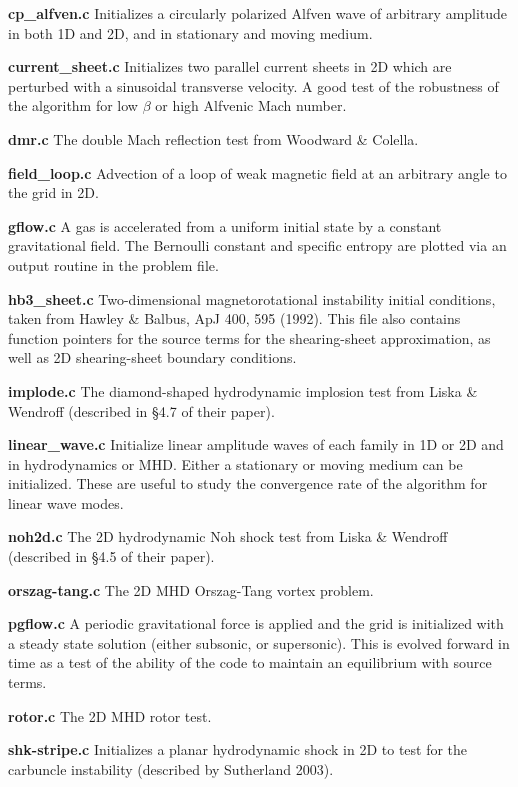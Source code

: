 \bigskip
\noindent
{\bf cp\_alfven.c}
Initializes a circularly polarized Alfven wave of arbitrary amplitude in
both 1D and 2D, and in stationary and moving medium.

\bigskip
\noindent
{\bf current\_sheet.c}
Initializes two parallel current sheets in 2D which are perturbed with a
sinusoidal transverse velocity.  A good test of the robustness of the
algorithm for low $\beta$ or high Alfvenic Mach number.

\bigskip
\noindent
{\bf dmr.c}
The double Mach reflection test from Woodward \& Colella.

\bigskip
\noindent
{\bf field\_loop.c}
Advection of a loop of weak magnetic field at an arbitrary angle to the
grid in 2D.

\bigskip
\noindent
{\bf gflow.c}
A gas is accelerated from a uniform initial state by a constant
gravitational field.  The Bernoulli constant and specific entropy are
plotted via an output routine in the problem file.

\bigskip
\noindent
{\bf hb3\_sheet.c}
Two-dimensional magnetorotational instability initial conditions, taken
from Hawley \& Balbus, ApJ 400, 595 (1992).  This file also contains
function pointers for the source terms for the shearing-sheet approximation,
as well as 2D shearing-sheet boundary conditions.

\bigskip
\noindent
{\bf implode.c}
The diamond-shaped hydrodynamic implosion test from Liska \& Wendroff
(described in \S 4.7 of their paper).

\bigskip
\noindent
{\bf linear\_wave.c}
Initialize linear amplitude waves of each family in 1D or 2D and in
hydrodynamics or MHD.  Either a stationary or moving medium can be
initialized.  These are
useful to study the convergence rate of the algorithm for linear wave
modes.

\bigskip
\noindent
{\bf noh2d.c}
The 2D hydrodynamic Noh shock test from Liska \& Wendroff (described in
\S 4.5 of their paper).

\bigskip
\noindent
{\bf orszag-tang.c}
The 2D MHD Orszag-Tang vortex problem.

\bigskip
\noindent
{\bf pgflow.c} A periodic gravitational force is applied and the grid
is initialized with a steady state solution (either subsonic, or
supersonic).  This is evolved forward in time as a test of the ability
of the code to maintain an equilibrium with source terms.

\bigskip
\noindent
{\bf rotor.c}
The 2D MHD rotor test.

\bigskip
\noindent
{\bf shk-stripe.c}
Initializes a planar hydrodynamic shock in 2D to test for the
carbuncle instability (described by Sutherland 2003).

